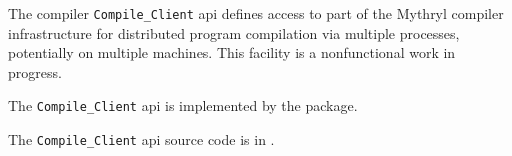 

The compiler {\tt Compile\_Client} api defines access to part of 
the Mythryl compiler infrastructure for distributed program compilation 
via multiple processes, potentially on multiple machines.  This facility 
is a nonfunctional work in progress.

The {\tt Compile\_Client} api is implemented by the  package.

The {\tt Compile\_Client} api source code is in .





